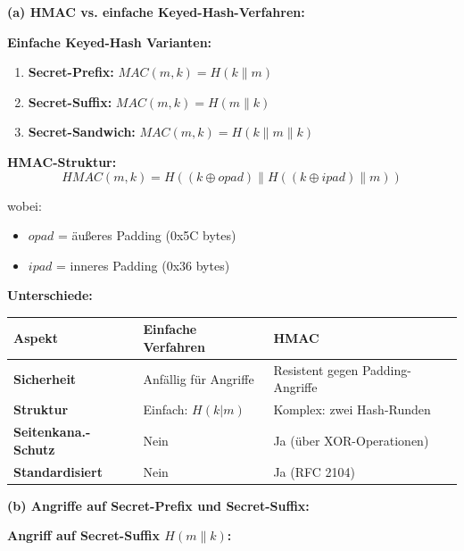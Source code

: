 \documentclass[12pt,a4paper]{article}
\begin{document}
\begin{tcolorbox}[colback=solutionbg, colframe=black!30]

\textbf{(a) HMAC vs. einfache Keyed-Hash-Verfahren:} \checkmark

\textbf{Einfache Keyed-Hash Varianten:}

\begin{enumerate}[1.]
    \item \textbf{Secret-Prefix:} $MAC(m, k) = H(k \| m)$
    \item \textbf{Secret-Suffix:} $MAC(m, k) = H(m \| k)$
    \item \textbf{Secret-Sandwich:} $MAC(m, k) = H(k \| m \| k)$
\end{enumerate}

\textbf{HMAC-Struktur:}
$$HMAC(m, k) = H((k \oplus opad) \| H((k \oplus ipad) \| m))$$

wobei:
\begin{itemize}
    \item $opad$ = äußeres Padding (0x5C bytes)
    \item $ipad$ = inneres Padding (0x36 bytes)
\end{itemize}

\textbf{Unterschiede:} \checkmark

\centering
\begin{tabular}{|l|l|l|}
    \hline
    \textbf{Aspekt} & \textbf{Einfache Verfahren} & \textbf{HMAC} \\
    \hline
    \textbf{Sicherheit} & Anfällig für Angriffe & Resistent gegen Padding-Angriffe \\
    \hline
    \textbf{Struktur} & Einfach: $H(k|m)$ & Komplex: zwei Hash-Runden \\
    \hline
    \textbf{Seitenkana.-Schutz} & Nein & Ja (über XOR-Operationen) \\
    \hline
    \textbf{Standardisiert} & Nein & Ja (RFC 2104) \\
    \hline
\end{tabular}

\textbf{(b) Angriffe auf Secret-Prefix und Secret-Suffix:} \checkmark

\textbf{Angriff auf Secret-Suffix $H(m \| k)$:}


\end{tcolorbox}
\end{document}
